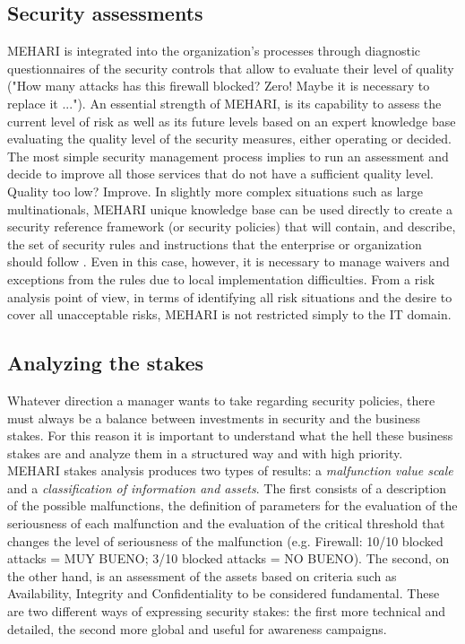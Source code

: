 \subsection{Security assessments}
MEHARI is integrated into the organization's processes through diagnostic questionnaires of the security controls that allow to evaluate their level of quality ("How many attacks has this firewall blocked? Zero! Maybe it is necessary to replace it ..."). An essential strength of MEHARI, is its capability to assess the current level of risk as well as its future levels based on an expert knowledge base evaluating the quality level of the security measures, either operating or decided. The most simple security management process implies to run an assessment and decide to improve all those services that do not have a sufficient quality level. Quality too low? Improve. In slightly more complex situations such as large multinationals, MEHARI unique knowledge base can be used directly to create a security reference framework (or security policies) that will contain, and describe, the set of security rules and instructions that the enterprise or organization should follow . Even in this case, however, it is necessary to manage waivers and exceptions from the rules due to local implementation difficulties. From a risk analysis point of view, in terms of identifying all risk situations and the desire to cover all unacceptable risks, MEHARI is not restricted simply to the IT domain.
\subsection{Analyzing the stakes}
Whatever direction a manager wants to take regarding security policies, there must always be a balance between investments in security and the business stakes. For this reason it is important to understand what the hell these business stakes are and analyze them in a structured way and with high priority. MEHARI stakes analysis produces two types of results: a \textit{malfunction value scale} and a \textit{classification of information and assets}. The first consists of a description of the possible malfunctions, the definition of parameters for the evaluation of the seriousness of each malfunction and the evaluation of the critical threshold that changes the level of seriousness of the malfunction (e.g. Firewall: 10/10 blocked attacks = MUY BUENO; 3/10 blocked attacks = NO BUENO). The second, on the other hand, is an assessment of the assets based on criteria such as Availability, Integrity and Confidentiality to be considered fundamental. These are two different ways of expressing security stakes: the first more technical and detailed, the second more global and useful for awareness campaigns.
